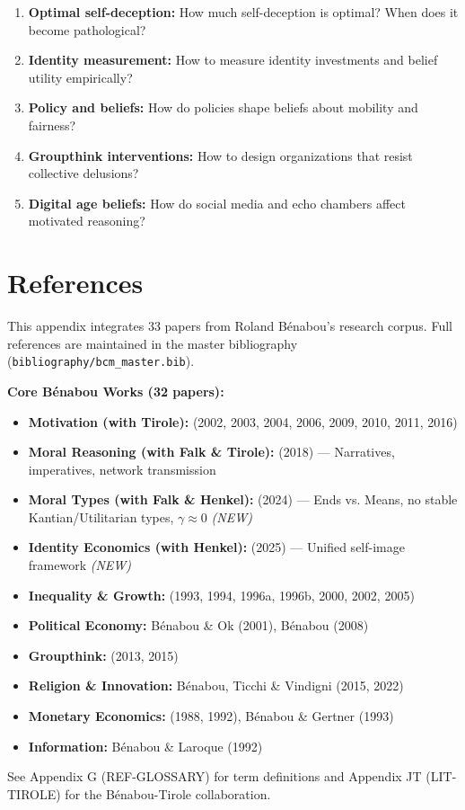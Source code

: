 \begin{enumerate}
    \item \textbf{Optimal self-deception:} How much self-deception is optimal? When does it become pathological?
    \item \textbf{Identity measurement:} How to measure identity investments and belief utility empirically?
    \item \textbf{Policy and beliefs:} How do policies shape beliefs about mobility and fairness?
    \item \textbf{Groupthink interventions:} How to design organizations that resist collective delusions?
    \item \textbf{Digital age beliefs:} How do social media and echo chambers affect motivated reasoning?
\end{enumerate}

\section{References}
\label{sec:rb-references}

\nocite{bcm_master}

This appendix integrates 33 papers from Roland Bénabou's research corpus. Full references are maintained in the master bibliography (\texttt{bibliography/bcm\_master.bib}).

\textbf{Core Bénabou Works (32 papers):}
\begin{itemize}
    \item \textbf{Motivation (with Tirole):} (2002, 2003, 2004, 2006, 2009, 2010, 2011, 2016)
    \item \textbf{Moral Reasoning (with Falk \& Tirole):} (2018) --- Narratives, imperatives, network transmission
    \item \textbf{Moral Types (with Falk \& Henkel):} (2024) --- Ends vs. Means, no stable Kantian/Utilitarian types, $\gamma \approx 0$ \textit{(NEW)}
    \item \textbf{Identity Economics (with Henkel):} (2025) --- Unified self-image framework \textit{(NEW)}
    \item \textbf{Inequality \& Growth:} (1993, 1994, 1996a, 1996b, 2000, 2002, 2005)
    \item \textbf{Political Economy:} Bénabou \& Ok (2001), Bénabou (2008)
    \item \textbf{Groupthink:} (2013, 2015)
    \item \textbf{Religion \& Innovation:} Bénabou, Ticchi \& Vindigni (2015, 2022)
    \item \textbf{Monetary Economics:} (1988, 1992), Bénabou \& Gertner (1993)
    \item \textbf{Information:} Bénabou \& Laroque (1992)
\end{itemize}

See Appendix G (REF-GLOSSARY) for term definitions and Appendix JT (LIT-TIROLE) for the Bénabou-Tirole collaboration.


